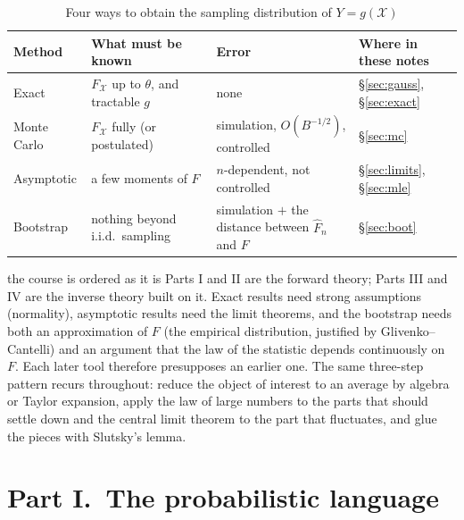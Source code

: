 \documentclass[11pt,a4paper]{article}
\newcommand{\Fn}{\widehat F_n}
\begin{document}
\begin{table}[h]
\centering\small
\caption{Four ways to obtain the sampling distribution of $Y=g(\mathcal X)$}\label{tab:fourways}
\begin{tabular}{@{}>{\raggedright\arraybackslash}p{2.4cm}>{\raggedright\arraybackslash}p{4.1cm}>{\raggedright\arraybackslash}p{3.9cm}>{\raggedright\arraybackslash}p{3.2cm}@{}}
\toprule
Method & What must be known & Error & Where in these notes\\
\midrule
Exact & $F_{\mathcal X}$ up to $\theta$, and tractable $g$ & none & \S\ref{sec:gauss}, \S\ref{sec:exact}\\
Monte Carlo & $F_{\mathcal X}$ fully (or postulated) & simulation, $O(B^{-1/2})$, controlled & \S\ref{sec:mc}\\
Asymptotic & a few moments of $F$ & $n$-dependent, not controlled & \S\ref{sec:limits}, \S\ref{sec:mle}\\
Bootstrap & nothing beyond i.i.d.\ sampling & simulation $+$ the distance between $\Fn$ and $F$ & \S\ref{sec:boot}\\
\bottomrule
\end{tabular}
\end{table}

\begin{whybox}{the course is ordered as it is}
Parts I and II are the forward theory; Parts III and IV are the inverse theory built on it. Exact results need strong assumptions (normality), asymptotic results need the limit theorems, and the bootstrap needs both an approximation of $F$ (the empirical distribution, justified by Glivenko--Cantelli) and an argument that the law of the statistic depends continuously on $F$. Each later tool therefore presupposes an earlier one. The same three-step pattern recurs throughout: reduce the object of interest to an average by algebra or Taylor expansion, apply the law of large numbers to the parts that should settle down and the central limit theorem to the part that fluctuates, and glue the pieces with Slutsky's lemma.
\end{whybox}

\part*{Part I.\ The probabilistic language}
\end{document}
